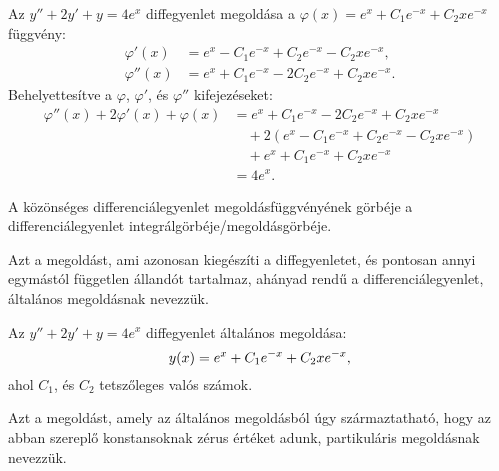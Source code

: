 \begin{mdframed}[
    style=example,
    nobreak,
  ]
  Az $y'' + 2y' + y = 4e^x$ diffegyenlet megoldása a
  $\varphi(x) = e^x + C_1 e^{-x} + C_2 x e^{-x}$ függvény:
  \begin{align*}
    \varphi'(x)  & = e^x - C_1 e^{-x} + C_2 e^{-x} - C_2 x e^{-x},  \\
    \varphi''(x) & = e^x + C_1 e^{-x} - 2C_2 e^{-x} + C_2 x e^{-x}.
  \end{align*}
  Behelyettesítve a $\varphi$, $\varphi'$, és $\varphi''$ kifejezéseket:
  \begin{align*}
    \varphi''(x) + 2\varphi'(x) + \varphi(x)
     & = e^x + C_1 e^{-x} - 2C_2 e^{-x} + C_2 x e^{-x}
    \\
     & \quad + 2 \left( e^x - C_1 e^{-x} + C_2 e^{-x} - C_2 x e^{-x} \right)
    \\
     & \quad + e^x + C_1 e^{-x} + C_2 x e^{-x}
    \\
     & = 4e^x.
  \end{align*}
\end{mdframed}

\begin{definition}[Megoldásgörbe]
  A közönséges differenciálegyenlet megoldásfüggvényének görbéje a
  differenciálegyenlet integrálgörbéje/megoldásgörbéje.
\end{definition}

\begin{definition}
  Azt a megoldást, ami azonosan kiegészíti a diffegyenletet, és pontosan annyi
  egymástól független állandót tartalmaz, ahányad rendű a differenciálegyenlet,
  általános megoldásnak nevezzük.
\end{definition}

\begin{example}
  Az $y'' + 2y' + y = 4e^x$ diffegyenlet általános megoldása:
  \begin{equation*}
    y(x) = e^x + C_1 e^{-x} + C_2 x e^{-x}
    \text,
  \end{equation*}
  ahol $C_1$, és $C_2$ tetszőleges valós számok.
\end{example}

\begin{definition}
  Azt a megoldást, amely az általános megoldásból úgy származtatható, hogy az
  abban szereplő konstansoknak zérus értéket adunk, partikuláris megoldásnak
  nevezzük.
\end{definition}

